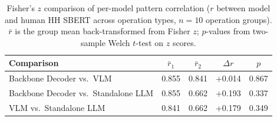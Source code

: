 \begin{table}[t]
\centering\small
\setlength{\tabcolsep}{4pt}

\caption{Fisher's $z$ comparison of per-model pattern correlation ($r$ between model and human HH SBERT across operation types, $n{=}10$ operation groups). $\bar{r}$ is the group mean back-transformed from Fisher $z$; $p$-values from two-sample Welch $t$-test on $z$ scores.}
\label{tab:fisher_z_pattern}
\begin{tabular}{lcccc}
\toprule
Comparison & $\bar{r}_1$ & $\bar{r}_2$ & $\Delta r$ & $p$ \\
\midrule
Backbone Decoder vs.\ VLM & 0.855 & 0.841 & +0.014 & 0.867 \\
Backbone Decoder vs.\ Standalone LLM & 0.855 & 0.662 & +0.193 & 0.337 \\
VLM vs.\ Standalone LLM & 0.841 & 0.662 & +0.179 & 0.349 \\
\bottomrule
\end{tabular}
\end{table}
